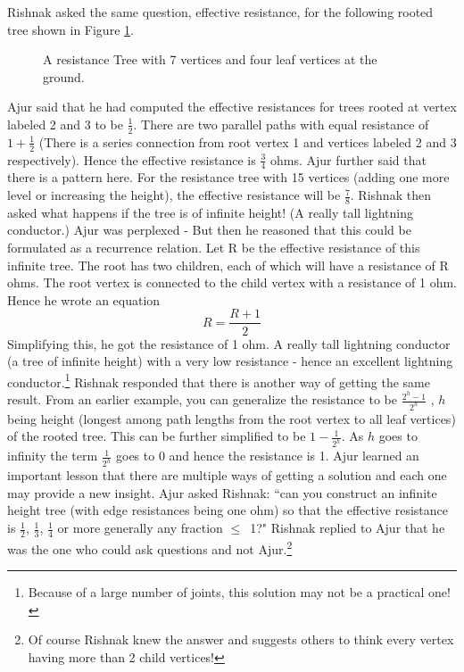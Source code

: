 Rishnak asked the same question, effective resistance, for the following rooted tree shown in Figure \ref{t4}.
\begin{figure}
\begin{center}


\caption{A resistance  Tree with 7 vertices and four leaf vertices at the ground. }\label{t4}
\end{center}
\end{figure}

Ajur said that he had computed the effective resistances for trees rooted at vertex labeled 2 and 3 to be $\frac{1}{2}$. There are two parallel paths with equal resistance of $1+\frac{1}{2}$ (There is a series connection from root vertex 1 and vertices labeled 2 and 3 respectively). Hence the effective resistance is $\frac{3}{4}$ ohms. Ajur further said that there is a pattern here. For the resistance tree with 15 vertices (adding one more level or increasing the height), the effective resistance will be $\frac{7}{8}$. Rishnak then asked what happens if the tree is of infinite height! (A really tall lightning conductor.) Ajur was perplexed - But then he reasoned that this could be formulated as a recurrence relation. Let R be the effective resistance of this infinite tree. The root has two children, each of which will have a resistance of R ohms. The root vertex is connected to the child vertex with a resistance of 1 ohm. Hence he wrote an equation $$R= \frac{R+1}{2}$$ Simplifying this, he got the resistance of 1 ohm. A really tall lightning conductor (a tree of infinite height) with a very low resistance - hence an excellent lightning conductor.\footnote{Because of a large number of joints, this solution may not be a practical one!} Rishnak responded that there is another way of getting the same result. From an earlier example, you can generalize the resistance to be $\frac{2^h-1}{2^h}$ , $h$ being height (longest among path lengths from the root vertex to all leaf vertices) of the rooted tree. This can be further simplified to be $1-\frac{1}{2^h}$. As $h$ goes to infinity the term $\frac{1}{2^h}$ goes to 0 and hence the resistance is 1. Ajur learned an important lesson that there are multiple ways of getting a solution and each one may provide a new insight. Ajur asked Rishnak: ``can you construct an infinite height tree (with edge resistances being one ohm) so that the effective resistance is $\frac{1}{2}$, $\frac{1}{3}$, $\frac{1}{4}$ or more generally any fraction $\leq$~1?" Rishnak replied to Ajur that he was the one who could ask questions and not Ajur.\footnote{Of course Rishnak knew the answer and suggests others to think every vertex having more than 2 child vertices!}

